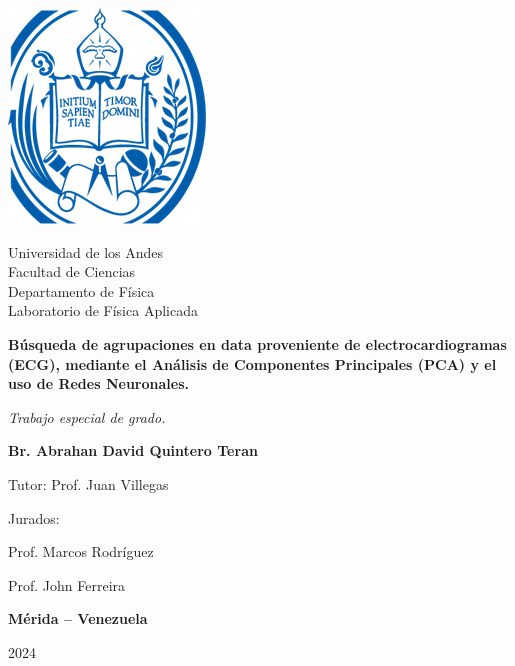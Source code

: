 \documentclass[spanish,11pt,letterpaper,oneside]{memoir}
\begin{document}
\frontmatter
\begin{titlingpage}
  \begin{center}
  	{\includegraphics[width=0.35\linewidth]{Sem_1/figuras/ulaLogo}\par}
  	\vspace{1cm}
	\begin{Large}
		Universidad de los Andes \\
		Facultad de Ciencias \\ 
		Departamento de Física \\ 
		Laboratorio de Física Aplicada\par
	\end{Large}
	\vspace{0.7cm}
	\textbf{{\Large Búsqueda de agrupaciones en data proveniente de electrocardiogramas (ECG), mediante el Análisis de Componentes Principales (PCA) y el uso de Redes Neuronales.}}\par
	\vspace{0.5cm}
	{\itshape\large Trabajo especial de grado.}\par
	\vspace{0.5cm}
	{\large\textbf{Br. Abrahan David Quintero Teran}}\par
   	\vspace{0.5cm}
    {\large Tutor: Prof. Juan Villegas}\par
    \vspace{0.5cm}
    \begin{flushright}
    	{\large Jurados: \par
    	Prof. Marcos Rodríguez \par
    	Prof. John Ferreira \par}
    \end{flushright}
    {\large\textbf{Mérida -- Venezuela}} \par
    {\large 2024} %
  \end{center}
\end{titlingpage}
\end{document}
